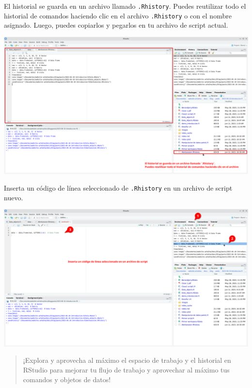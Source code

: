 \documentclass[
  a4paper,
]{article}
\begin{document}
El historial se guarda en un archivo llamado \texttt{.Rhistory}. Puedes
reutilizar todo el historial de comandos haciendo clic en el archivo
\texttt{.Rhistory} o con el nombre asignado. Luego, puedes copiarlos y
pegarlos en tu archivo de script actual.

\includegraphics{images/Screenshot_20230611_103319.png}

Inserta un código de línea seleccionado de \texttt{.Rhistory} en un
archivo de script nuevo.

\includegraphics{images/Screenshot_20230611_103755.png}

\begin{quote}
¡Explora y aprovecha al máximo el espacio de trabajo y el historial en
RStudio para mejorar tu flujo de trabajo y aprovechar al máximo tus
comandos y objetos de datos!
\end{quote}


\printbibliography
\end{document}
